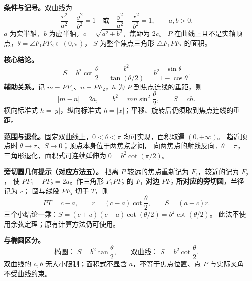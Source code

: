 \begin{statementbox}
\textbf{条件与记号。}双曲线为
\[
 \frac{x^2}{a^2}-\frac{y^2}{b^2}=1\quad\text{或}\quad
 \frac{y^2}{a^2}-\frac{x^2}{b^2}=1,\qquad a,b>0.
\]
$a$ 为实半轴，$b$ 为虚半轴，$c=\sqrt{a^2+b^2}$，焦距为 $2c$。
$P$ 在曲线上且不是实轴顶点，$\theta=\angle F_1PF_2\in(0,\pi)$，
$S$ 为整个焦点三角形 $\triangle F_1PF_2$ 的面积。

\medskip
\textbf{核心结论。}
\[
 \boxed{S=b^2\cot\frac\theta2}
 =\boxed{\frac{b^2}{\tan(\theta/2)}}
 =\boxed{b^2\frac{\sin\theta}{1-\cos\theta}}.
\]
\textbf{辅助关系。}记 $m=PF_1$、$n=PF_2$，$h$ 为 $P$ 到焦点连线的垂距，则
\[
 |m-n|=2a,\qquad
 \boxed{b^2=mn\sin^2\frac\theta2},\qquad
 \boxed{S=ch}.
\]
横向标准式 $h=|y|$，纵向标准式 $h=|x|$；平移、旋转后仍须取到焦点连线的垂距。

\medskip
\textbf{范围与退化。}固定双曲线上，$0<\theta<\pi$ 均可实现，面积取遍 $(0,+\infty)$。
趋近顶点时 $\theta\to\pi$、$S\to0$；顶点本身位于两焦点之间，
向两焦点的射线反向，$\theta=\pi$，三角形退化，面积式可连续延伸为
$0=b^2\cot(\pi/2)$。

\medskip
\textbf{旁切圆几何提示（对应方法五）。}
把离 $P$ 较远的焦点重新记为 $F_1$，较近的记为 $F_2$，
使 $PF_1-PF_2=2a$。作三角形 $F_1PF_2$ 的
\textbf{$F_1$ 对边 $PF_2$ 所对应的旁切圆}，半径记为 $r$；
圆与线段 $PF_2$ 切于 $T$，则
\[
 \boxed{PT=c-a},\qquad
 \boxed{r=(c-a)\cot\frac\theta2},\qquad
 \boxed{S=(a+c)r}.
\]
三个小结论一乘：$S=(c+a)(c-a)\cot(\theta/2)=b^2\cot(\theta/2)$。
此法不使用余弦定理；原有计算方法仍可使用。

\medskip
\textbf{与椭圆区分。}
\[
 \text{椭圆： }S=b^2\tan\frac\theta2,
 \qquad \text{双曲线： }S=b^2\cot\frac\theta2.
\]
双曲线的 $a,b$ 无大小限制；面积式不显含 $a$，不等于焦点位置、点 $P$ 与实际夹角不受曲线约束。
\end{statementbox}
\clearpage
